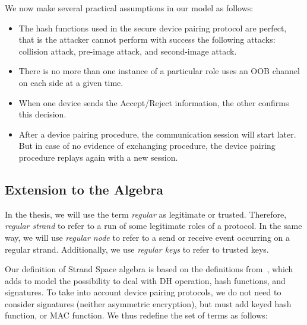 We now make several practical assumptions in our model as follows: 
\begin{itemize}
\item The hash functions used in the secure device pairing protocol are perfect, that is the attacker cannot perform with success the following attacks: collision attack, pre-image attack, and second-image attack.
\item There is no more than one instance of a particular role uses an OOB channel on each side at a given time.
\item When one device sends the Accept/Reject information, the other confirms this decision.
\item After a device pairing procedure, the communication session will start later. But in case of no evidence of exchanging procedure, the device pairing procedure replays again with a new session. 
\end{itemize} 

\subsection{Extension to the Algebra}

In the thesis, we will use the term \emph{regular} as legitimate or trusted. Therefore, \emph{regular strand} to refer to a run of some legitimate roles of a protocol. In the same way, we will use \emph{regular node} to refer to a send or receive event occurring on a regular strand. Additionally, we use \emph{regular keys} to refer to trusted keys.

Our definition of Strand Space algebra is based on the definitions from~\cite{1212716}, which adds to model the possibility to deal with DH operation, hash functions, and signatures. To take into account device pairing protocols, we do not need  to consider signatures (neither asymmetric encryption), but must add keyed hash function, or MAC function. We thus redefine the set of terms as follows:

